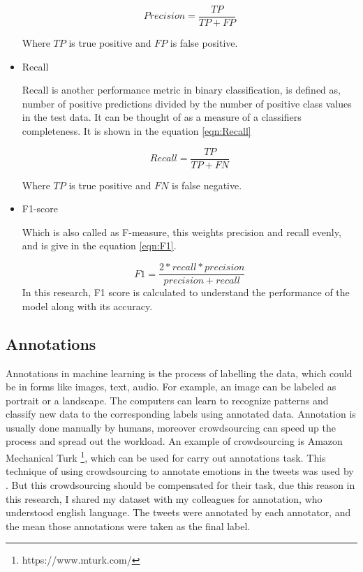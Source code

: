 \begin{itemize}
    \begin{equation}
    \label{eqn:Precision}
    Precision = \frac{TP}{TP + FP}
    \end{equation}
    
    Where $TP$ is true positive and $FP$ is false positive.
    
    \item Recall
    
    Recall is another performance metric in binary classification, is defined as, number of positive predictions divided by the number of positive class values in the test data. It can be thought of as a measure of a classifiers completeness. It is shown in the equation \ref{eqn:Recall} 
    
    \begin{equation}
        \label{eqn:Recall}
    Recall = \frac{TP}{TP + FN}
    \end{equation}
    
     Where $TP$ is true positive and $FN$ is false negative.
    
    \item F1-score
   
    Which is also called as F-measure, this weights precision and recall evenly, and is give in the equation \ref{eqn:F1}.
    
        \begin{equation}
        \label{eqn:F1}
    F1 = \frac{2 * recall * precision}{precision + recall}
    \end{equation}
    In this research, F1 score is calculated to understand the performance of the model along with its accuracy.
\end{itemize}

\subsection{Annotations}

Annotations in machine learning is the process of labelling the data, which could be in forms like images, text, audio. For example, an image can be labeled as portrait or a landscape. The computers can learn to recognize patterns and classify new data to the corresponding labels using annotated data. Annotation is usually done manually by humans, moreover crowdsourcing can speed up the process and spread out the workload. An example of crowdsourcing is Amazon Mechanical Turk \footnote{https://www.mturk.com/}, which can be used for carry out annotations task. This technique of using crowdsourcing to annotate emotions in the tweets was used by \cite{Mohammad:2010:EEC:1860631.1860635}. But this crowdsourcing should be compensated for their task, due this reason in this research, I shared my dataset with my colleagues for annotation, who understood english language. The tweets were annotated by each annotator, and the mean those annotations were taken as the final label.  

